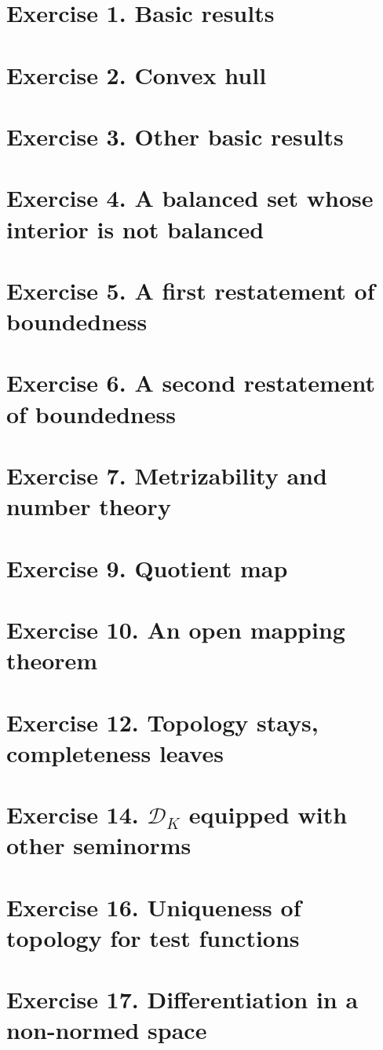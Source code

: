 % 
\section{Exercise 1. Basic results}\label{1.1}
 
% 
\section{Exercise 2. Convex hull}
 
% 
\section{Exercise 3. Other basic results}
 
% 
\section{Exercise 4. A balanced set whose interior is not balanced}
 
% 
\section{Exercise 5. A first restatement of boundedness}
 
% 
\section{Exercise 6. A second restatement of boundedness}
 
% 
\section{Exercise 7. Metrizability and number theory}
 
% 
\setcounter{section}{8}
% 
\section{Exercise 9. Quotient map}
 
% 
\section{Exercise 10. An open mapping theorem}
 
% 
\setcounter{section}{11}
% 
\section{Exercise 12. Topology stays, completeness leaves}

% 
\setcounter{section}{13}
% 
\section{Exercise 14. \texorpdfstring{$\mathcal{D}_K$}{D\_K} equipped with other seminorms}
 
% 
\setcounter{section}{15}
% 
\section{Exercise 16. Uniqueness of topology for test functions}\label{1.16}
 
% 
\section{Exercise 17. Differentiation in a non-normed space}\label{1.17}

% 
% 
